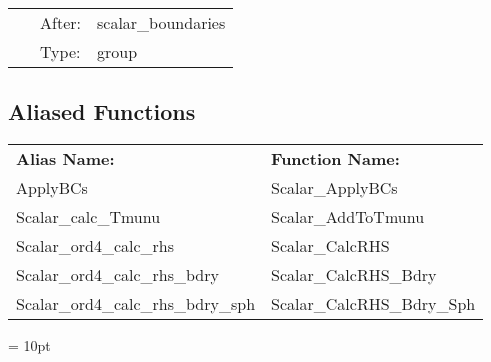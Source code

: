 \hspace{5mm}

 \begin{tabular*}{160mm}{cll} 
~ & After:  & scalar\_boundaries \\ 
~ & Type:  & group \\ 
\end{tabular*} 


\subsection*{Aliased Functions}

\hspace{5mm}

 \begin{tabular*}{160mm}{ll} 

{\bf Alias Name:} ~~~~~~~ & {\bf Function Name:} \\ 
ApplyBCs & Scalar\_ApplyBCs \\ 
Scalar\_calc\_Tmunu & Scalar\_AddToTmunu \\ 
Scalar\_ord4\_calc\_rhs & Scalar\_CalcRHS \\ 
Scalar\_ord4\_calc\_rhs\_bdry & Scalar\_CalcRHS\_Bdry \\ 
Scalar\_ord4\_calc\_rhs\_bdry\_sph & Scalar\_CalcRHS\_Bdry\_Sph \\ 
\end{tabular*} 



\vspace{5mm}\parskip = 10pt 

